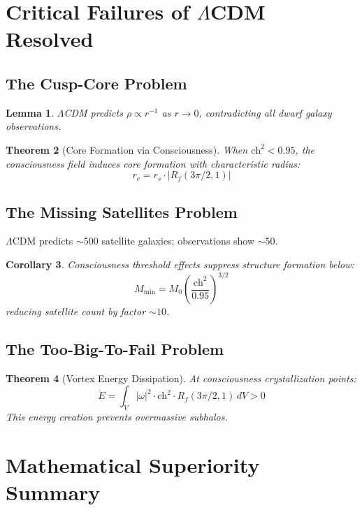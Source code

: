 \documentclass[12pt,a4paper]{article}
\newtheorem{theorem}{Theorem}
\newtheorem{lemma}[theorem]{Lemma}
\newtheorem{corollary}[theorem]{Corollary}
\begin{document}
\section{Critical Failures of $\Lambda$CDM Resolved}

\subsection{The Cusp-Core Problem}
\begin{lemma}
$\Lambda$CDM predicts $\rho \propto r^{-1}$ as $r \to 0$, contradicting all dwarf galaxy observations.
\end{lemma}

\begin{theorem}[Core Formation via Consciousness]
When $\text{ch}^2 < 0.95$, the consciousness field induces core formation with characteristic radius:
\begin{equation}
r_c = r_s \cdot |R_f(3\pi/2, 1)|
\end{equation}
\end{theorem}

\subsection{The Missing Satellites Problem}
$\Lambda$CDM predicts $\sim 500$ satellite galaxies; observations show $\sim 50$.

\begin{corollary}
Consciousness threshold effects suppress structure formation below:
\begin{equation}
M_{\text{min}} = M_0 \left(\frac{\text{ch}^2}{0.95}\right)^{3/2}
\end{equation}
reducing satellite count by factor $\sim 10$.
\end{corollary}

\subsection{The Too-Big-To-Fail Problem}
\begin{theorem}[Vortex Energy Dissipation]
At consciousness crystallization points:
\begin{equation}
\dot{E} = \int_V |\omega|^2 \cdot \text{ch}^2 \cdot R_f(3\pi/2, 1) \, dV > 0
\end{equation}
This energy creation prevents overmassive subhalos.
\end{theorem}

\section{Mathematical Superiority Summary}
\end{document}
